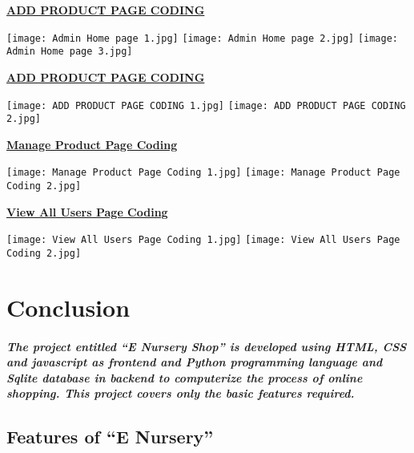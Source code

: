 \documentclass[12pt]{report}
\begin{document}
    \pagebreak
    \textbf{\underline{\large ADD PRODUCT PAGE CODING}}
    \begin{center}
        \texttt{[image: Admin Home page 1.jpg]}
        \texttt{[image: Admin Home page 2.jpg]}
        \texttt{[image: Admin Home page 3.jpg]}
    \end{center}
    
    \pagebreak
    \textbf{\underline{\large ADD PRODUCT PAGE CODING}}
    \begin{center}
        \texttt{[image: ADD PRODUCT PAGE CODING 1.jpg]}
        \texttt{[image: ADD PRODUCT PAGE CODING 2.jpg]}
    \end{center}
    
    \pagebreak
    \textbf{\underline{\large Manage Product Page Coding}}
    \begin{center}
        \texttt{[image: Manage Product Page Coding 1.jpg]}
        \texttt{[image: Manage Product Page Coding 2.jpg]}
    \end{center}
    
     \pagebreak
    \textbf{\underline{\large View All Users Page Coding}}
    \begin{center}
        \texttt{[image: View All Users Page Coding 1.jpg]}
        \texttt{[image: View All Users Page Coding 2.jpg]}
    \end{center}
    \chapter{Conclusion}
    \paragraph
    {
    The project entitled “E Nursery Shop” is developed using HTML, CSS and javascript as frontend and Python programming language and Sqlite database in backend to computerize the process of online shopping. This project covers only the basic features required.
    }
        \section{Features of “E Nursery”}
\end{document}
